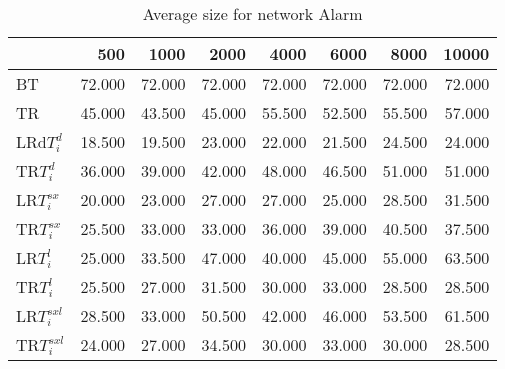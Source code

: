 \begin{table}
\begin{center}
\begin{tabular}{lrrrrrrr}
 & 500 &  1000 & 2000 & 4000 & 6000& 8000&  10000\\\hline
BT & 72.000 & 72.000 & 72.000 & 72.000 & 72.000 & 72.000 & 72.000\\\hline
TR & 45.000 & 43.500 & 45.000 & 55.500 & 52.500 & 55.500 & 57.000\\\hline
LRd$T_i^d$ & 18.500 & 19.500 & 23.000 & 22.000 & 21.500 & 24.500 & 24.000\\\hline
TR$T_i^d$ & 36.000 & 39.000 & 42.000 & 48.000 & 46.500 & 51.000 & 51.000\\\hline
LR$T_i^{sx}$ & 20.000 & 23.000 & 27.000 & 27.000 & 25.000 & 28.500 & 31.500\\\hline
TR$T_i^{sx}$ & 25.500 & 33.000 & 33.000 & 36.000 & 39.000 & 40.500 & 37.500\\\hline
LR$T_i^l$ & 25.000 & 33.500 & 47.000 & 40.000 & 45.000 & 55.000 & 63.500\\\hline
TR$T_i^l$ & 25.500 & 27.000 & 31.500 & 30.000 & 33.000 & 28.500 & 28.500\\\hline
LR$T_i^{sxl}$ & 28.500 & 33.000 & 50.500 & 42.000 & 46.000 & 53.500 & 61.500\\\hline
TR$T_i^{sxl}$ & 24.000 & 27.000 & 34.500 & 30.000 & 33.000 & 30.000 & 28.500\\\hline
\end{tabular}
\end{center}
\caption{Average size for network Alarm }
\label{Alarmsi}
\end{table}

